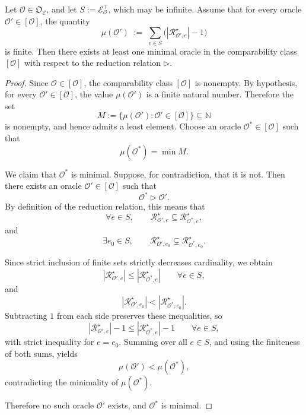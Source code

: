 \begin{proposition}
\label{prop:existence_minimal_infinite_sufficient}
Let $\mathcal{O} \in \mathfrak{O}_{\mathcal{E}}$, and let $S:=\mathcal{E}^{\top}_{\mathcal{O}}$, which may be infinite. Assume that for every oracle $\mathcal{O}' \in [\mathcal{O}]$, the quantity
\[
\mu(\mathcal{O}')
\;:=\;
\sum_{e\in S} \bigl(|\mathcal{R}^{\star}_{\mathcal{O}',e}|-1\bigr)
\]
is finite. Then there exists at least one minimal oracle in the comparability class $[\mathcal{O}]$ with respect to the reduction relation $\triangleright$.
\end{proposition}

\begin{proof}
Since $\mathcal{O}\in[\mathcal{O}]$, the comparability class $[\mathcal{O}]$ is nonempty. By hypothesis, for every $\mathcal{O}'\in[\mathcal{O}]$, the value $\mu(\mathcal{O}')$ is a finite natural number. Therefore the set
\[
M
:=
\{\mu(\mathcal{O}') : \mathcal{O}'\in[\mathcal{O}]\}
\subseteq \mathbb{N}
\]
is nonempty, and hence admits a least element. Choose an oracle $\mathcal{O}^{\ast}\in[\mathcal{O}]$ such that
\[
\mu(\mathcal{O}^{\ast})=\min M.
\]

We claim that $\mathcal{O}^{\ast}$ is minimal. Suppose, for contradiction, that it is not. Then there exists an oracle $\mathcal{O}'\in[\mathcal{O}]$ such that
\[
\mathcal{O}^{\ast}\triangleright \mathcal{O}'.
\]
By definition of the reduction relation, this means that
\[
\forall e\in S,\qquad
\mathcal{R}^{\star}_{\mathcal{O}',e}\subseteq \mathcal{R}^{\star}_{\mathcal{O}^{\ast},e},
\]
and
\[
\exists e_{0}\in S,\qquad
\mathcal{R}^{\star}_{\mathcal{O}',e_{0}}\subsetneq \mathcal{R}^{\star}_{\mathcal{O}^{\ast},e_{0}}.
\]

Since strict inclusion of finite sets strictly decreases cardinality, we obtain
\[
|\mathcal{R}^{\star}_{\mathcal{O}',e}|
\le
|\mathcal{R}^{\star}_{\mathcal{O}^{\ast},e}|
\qquad\forall e\in S,
\]
and
\[
|\mathcal{R}^{\star}_{\mathcal{O}',e_{0}}|
<
|\mathcal{R}^{\star}_{\mathcal{O}^{\ast},e_{0}}|.
\]
Subtracting $1$ from each side preserves these inequalities, so
\[
|\mathcal{R}^{\star}_{\mathcal{O}',e}|-1
\le
|\mathcal{R}^{\star}_{\mathcal{O}^{\ast},e}|-1
\qquad\forall e\in S,
\]
with strict inequality for $e=e_{0}$. Summing over all $e\in S$, and using the finiteness of both sums, yields
\[
\mu(\mathcal{O}')
<
\mu(\mathcal{O}^{\ast}),
\]
contradicting the minimality of $\mu(\mathcal{O}^{\ast})$.

Therefore no such oracle $\mathcal{O}'$ exists, and $\mathcal{O}^{\ast}$ is minimal.
\end{proof}

